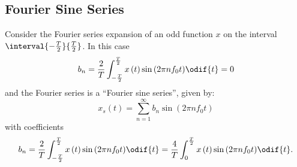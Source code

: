 \documentclass{article}
\begin{document}
\subsection{Fourier Sine Series}
Consider the Fourier series expansion of an odd function \(x\) on the interval \(\interval{-\frac{T}{2}}{\frac{T}{2}}\).
In this case
\begin{equation*}
    b_n = \frac{2}{T} \int_{-\frac{T}{2}}^{\frac{T}{2}} x\left( t \right) \sin{\left( 2\pi n f_0 t \right)} \odif{t} = 0
\end{equation*}
and the Fourier series is a ``Fourier sine series'', given by:
\begin{equation*}
    x_s\left( t \right) = \sum_{n = 1}^\infty b_n \sin{\left( 2\pi n f_0 t \right)}
\end{equation*}
with coefficients
\begin{equation*}
    b_n = \frac{2}{T} \int_{-\frac{T}{2}}^{\frac{T}{2}} x\left( t \right) \sin{\left( 2 \pi n f_0 t \right)} \odif{t} = \frac{4}{T} \int_0^{\frac{T}{2}} x\left( t \right) \sin{\left( 2\pi n f_0 t \right)} \odif{t}.
\end{equation*}
\end{document}
